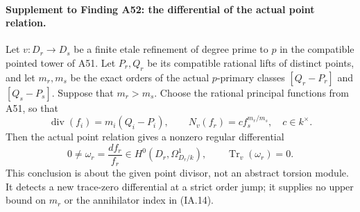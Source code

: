 \documentclass[11pt,a4paper]{article}
\begin{document}
\paragraph{Supplement to Finding A52: the differential of the actual point relation.}
Let $v:D_r\to D_s$ be a finite etale refinement of degree prime
to $p$ in the compatible pointed tower of A51. Let $P_r,Q_r$
be its compatible rational lifts of distinct points, and let
$m_r,m_s$ be the exact orders of the actual $p$-primary classes
$[Q_r-P_r]$ and $[Q_s-P_s]$. Suppose that $m_r>m_s$.
Choose the rational principal functions from A51, so that
\[
 \operatorname{div}(f_i)=m_i(Q_i-P_i),\qquad
 N_v(f_r)=c f_s^{m_r/m_s},\quad c\in k^\times.
\tag{PD.1}
\]
Then the actual point relation gives a nonzero regular differential
\[
 0\ne\omega_r=\frac{df_r}{f_r}
       \in H^0(D_r,\Omega^1_{D_r/k}),\qquad
                         \operatorname{Tr}_v(\omega_r)=0.
\tag{PD.2}
\]
This conclusion is about the given point divisor, not an abstract
torsion module. It detects a new trace-zero differential at a
strict order jump; it supplies no upper bound on $m_r$ or the
annihilator index in (IA.14).
\end{document}
